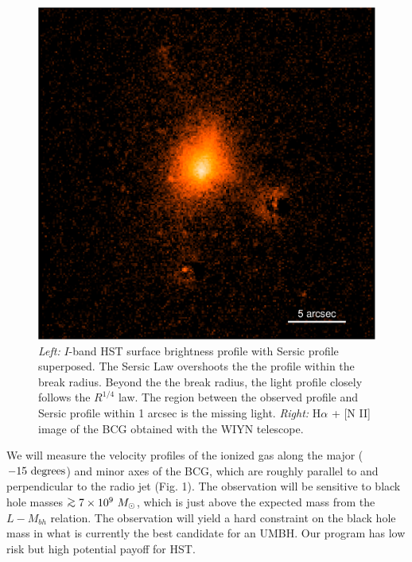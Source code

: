 \documentclass[12pt]{article}
\begin{document}
\begin{figure}[ht]
\begin{center}
\begin{minipage}{0.52\linewidth}
    \end{minipage}
    \begin{minipage}{0.47\linewidth}    
      \includegraphics*[width=\textwidth]{MS0735_Halpha}
    \end{minipage}
    \caption{{\it{Left:}} $I$-band HST surface brightness profile with
      Sersic profile superposed. The Sersic Law overshoots the the
      profile within the break radius.  Beyond the the break radius,
      the light profile closely follows the $R^{1/4}$
      law. The region between the observed profile and Sersic profile within 1 arcsec is the missing light.
      {\it{Right:}} H$\alpha$ + [N II]  image of the BCG obtained with the
      WIYN telescope.}
    \label{fig}
  \end{center}
\end{figure}



%
%
\describeobservations   %

We will measure the velocity profiles of the ionized gas along the major ($-15~\rm degrees$) and minor axes of the BCG, which are
roughly parallel to and perpendicular to the radio jet (Fig. 1).  The observation will be sensitive to black hole masses
 $\gae 7\times 10^9~M_{\odot}$, which is just above the expected mass from the $L-M_{bh}$ relation.
The observation will yield a hard constraint on the black hole mass in what is currently
the best candidate for an UMBH.  Our program has low risk but high potential payoff for HST.  
\end{document}
